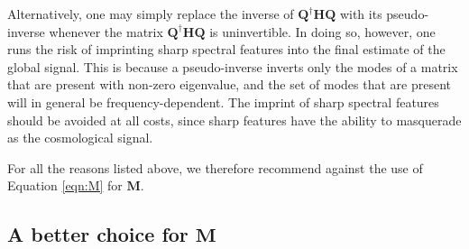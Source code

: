 \documentclass[twocolumn,apj,numberedappendix]{emulateapj}
\newcommand{\Hmat}{\mathbf{H}}
\newcommand{\Q}{\mathbf{Q}}
\newcommand{\M}{\mathbf{M}}
\newcommand{\acl}[1]{}
\begin{document}
Alternatively, one may simply replace the inverse of $\Q^\dagger \Hmat \Q$ with its pseudo-inverse whenever the matrix $\Q^\dagger \Hmat \Q$ is uninvertible. In doing so, however, one runs the risk of imprinting sharp spectral features into the final estimate of the global signal. This is because a pseudo-inverse inverts only the modes of a matrix that are present with non-zero eigenvalue, and the set of modes that are present will in general be frequency-dependent. The imprint of sharp spectral features should be avoided at all costs, since sharp features have the ability to masquerade as the cosmological signal.

For all the reasons listed above, we therefore recommend against the use of Equation \eqref{eqn:M} for $\M$. 
%



\subsection{A better choice for $\M$}
\label{sec:BetterM}
\end{document}
